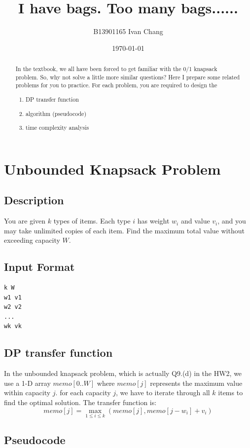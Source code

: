 \documentclass[a4paper,12pt]{article}
\title{I have bags. Too many bags......}
\author{B13901165 Ivan Chang}
\date{\today}
\begin{document}
\maketitle

\begin{abstract}
In the textbook, we all have been forced to get familiar with the 0/1 knapsack problem.
So, why not solve a little more similar questions?
Here I prepare some related problems for you to practice.
For each problem, you are required to design the 
\begin{enumerate}
    \item DP transfer function
    \item algorithm (pseudocode)
    \item time complexity analysis
\end{enumerate}

\end{abstract}

\section{Unbounded Knapsack Problem}
\subsection*{Description}
You are given $k$ types of items. Each type $i$ has weight $w_i$ and value $v_i$,
and you may take unlimited copies of each item.
Find the maximum total value without exceeding capacity $W$.

\subsection*{Input Format}
\begin{verbatim}
k W
w1 v1
w2 v2
...
wk vk
\end{verbatim}

\subsection*{DP transfer function}
In the unbounded knapsack problem, which is actually Q9.(d) in the HW2, 
we use a 1-D array $memo[0..W]$ where $memo[j]$ represents the maximum value within capacity $j$.
for each capacity $j$, we have to iterate through all $k$ items to find the optimal solution.
The transfer function is:
\[
memo[j] = \max_{1 \leq i \leq k}(memo[j], memo[j - w_i] + v_i)
\]

\subsection*{Pseudocode}
\end{document}

